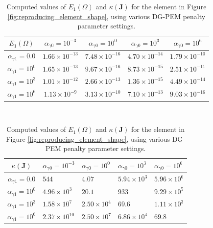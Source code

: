 \begin{table}
\centering
\begin{subtable}{1.0\textwidth}
\centering
\begin{tabular}{| c || c | c | c | c |}
    \hline
$E_1 (\Omega)$ & $\alpha_{\gamma0} = 10^{-3}$ & $\alpha_{\gamma0} = 10^{0}$ & $\alpha_{\gamma0} = 10^{3}$ & $\alpha_{\gamma0} = 10^{6}$ \\ \hline \hline
$\alpha_{\gamma1} = 0.0$	& $1.66 \times 10^{-13}$ & $7.48 \times 10^{-16}$ & $4.70 \times 10^{-14}$ & $1.79 \times 10^{-10}$ \\ \hline
$\alpha_{\gamma1} = 10^{0}$ & $1.65 \times 10^{-13}$ & $9.67 \times 10^{-16}$ & $8.73 \times 10^{-15}$ & $2.51 \times 10^{-11}$ \\ \hline
$\alpha_{\gamma1} = 10^{3}$ & $1.01 \times 10^{-12}$ & $2.66 \times 10^{-13}$ & $1.36 \times 10^{-15}$ & $4.49 \times 10^{-14}$ \\ \hline
$\alpha_{\gamma1} = 10^{6}$ & $1.13 \times 10^{-9}$ & $3.13 \times 10^{-10}$ & $7.10 \times 10^{-13}$ & $9.03 \times 10^{-16}$ \\
    \hline
    \end{tabular}
    \caption{Interpolation error: $E_1 (\Omega)$}
    \label{tab:interpolation_error_k1}
\end{subtable}%
\\
\begin{subtable}{1.0\textwidth}
\centering
\begin{tabular}{| c || l | l | l | l |}
    \hline
$\kappa(\bm{J})$ & $\alpha_{\gamma0} = 10^{-3}$	&	$\alpha_{\gamma0} = 10^{0}$	&	$\alpha_{\gamma0} = 10^{3}$	&	$\alpha_{\gamma0} = 10^{6}$ \\ \hline \hline
$\alpha_{\gamma1} = 0.0$	&	$544$ & $4.07$ & $5.94 \times 10^{3}$ & $5.96 \times 10^{6}$ \\ \hline
$\alpha_{\gamma1} = 10^{0}$	&	$4.96 \times 10^{3}$ & $20.1$ & $933$ & $9.29 \times 10^{5}$ \\ \hline
$\alpha_{\gamma1} = 10^{3}$	&	$1.58 \times 10^{7}$ & $2.50 \times 10^{4}$ & $69.6$ & $1.11 \times 10^{3}$ \\ \hline
$\alpha_{\gamma1} = 10^{6}$	&	$2.37 \times 10^{10}$ & $2.50 \times 10^{7}$ & $6.86 \times 10^{4}$ & $69.8$ \\
    \hline
    \end{tabular}
    \caption{DG-PEM linear system conditioning: $\kappa(\bm{J})$}
    \label{tab:condJ_k1}
\end{subtable}

\caption{Computed values of $E_1 (\Omega)$ and $\kappa(\bm{J})$ for the element in Figure \ref{fig:reproducing_element_shape}, using various DG-PEM penalty parameter settings.}
\label{tab:interpolation_error_and_condJ_k1}
\end{table}

